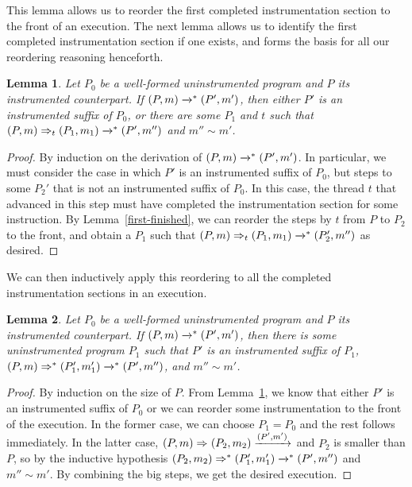 \documentclass[preprint, 10pt]{sigplanconf}
\newcommand{\cfg}[2]{\ensuremath{(#1, #2)}}
\newcommand{\execstar}[4]{\ensuremath{\cfg{#1}{#2} \tto{#3} #4}}
\newcommand{\iexec}[4]{\ensuremath{\cfg{#1}{#2} \Rightarrow_{#3} #4}}
\newcommand{\execs}[3]{\ensuremath{ \xrightarrow{#2}_{#1} #3}}
\newcommand{\execstars}[2]{\ensuremath{ \tto{#1} #2}}
\newcommand{\iexecstar}[3]{\ensuremath{(#1, #2) \Rightarrow^{*} #3}}
\newcommand{\tto}[1]{\mathrel{
  \vphantom{\xrightarrow{#1}}
  \smash{\xrightarrow{#1}}
  \vphantom{\to}^{*}}
}
\newtheorem{lemma}{Lemma}
\begin{document}
This lemma allows us to reorder the first completed instrumentation section to the front of an execution. The next lemma allows us to identify the first completed instrumentation section if one exists, and forms the basis for all our reordering reasoning henceforth.
\begin{lemma}\label{next-iexec}Let $P_0$ be a well-formed uninstrumented program and $P$ its instrumented counterpart. If $\execstar{P}{m}{}{(P', m')}$, then either $P'$ is an instrumented suffix of $P_0$, or there are some $P_1$ and $t$ such that $\iexec{P}{m}{t}{(P_1, m_1)} \execstars{}{(P', m'')}$ and $m'' \sim m'$.\end{lemma}
\begin{proof}By induction on the derivation of $\execstar{P}{m}{}{(P', m')}$. In particular, we must consider the case in which $P'$ is an instrumented suffix of $P_0$, but steps to some $P_2'$ that is not an instrumented suffix of $P_0$. In this case, the thread $t$ that advanced in this step must have completed the instrumentation section for some instruction. By Lemma~\ref{first-finished}, we can reorder the steps by $t$ from $P$ to $P_2$ to the front, and obtain a $P_1$ such that $\iexec{P}{m}{t}{(P_1, m_1)} \execstars{}{(P_2', m'')}$ as desired.\end{proof}

We can then inductively apply this reordering to all the completed instrumentation sections in an execution.
\begin{lemma}\label{exec-iexec1}Let $P_0$ be a well-formed uninstrumented program and $P$ its instrumented counterpart. If $\execstar{P}{m}{}{(P', m')}$, then there is some uninstrumented program $P_1$ such that $P'$ is an instrumented suffix of $P_1$, $\iexecstar{P}{m}{(P_1', m_1')} \execstars{}{(P', m'')}$, and $m'' \sim m'$.\end{lemma}
\begin{proof}By induction on the size of $P$. From Lemma~\ref{next-iexec}, we know that either $P'$ is an instrumented suffix of $P_0$ or we can reorder some instrumentation to the front of the execution. In the former case, we can choose $P_1 = P_0$ and the rest follows immediately. In the latter case, $\iexec{P}{m}{}{(P_2, m_2)} \execs{}{(P', m')}$ and $P_2$ is smaller than $P$, so by the inductive hypothesis $\iexecstar{P_2}{m_2}{(P_1', m_1')} \execstars{}{(P', m'')}$ and $m'' \sim m'$. By combining the big steps, we get the desired execution.\end{proof}
\end{document}
